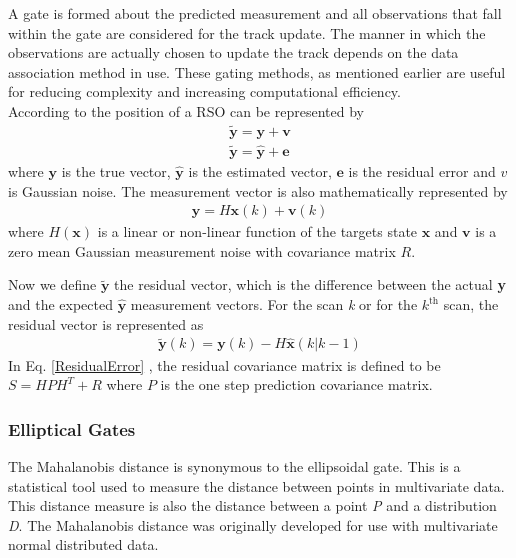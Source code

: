 \documentclass[]{aiaa-tc}%
\begin{document}
A gate is formed about the predicted measurement and all observations that fall within the gate are considered for the track update. The manner in which the observations are actually chosen to update the track depends on the data association method in use. These gating methods, as mentioned earlier are useful for reducing complexity and increasing computational efficiency. \\

According to \cite{crassidis_optimal_2011} the position of a RSO can be represented by
\begin{align*}
\tilde{\textbf{y}} = \textbf{y} + \textbf{v} \\
\tilde{\textbf{y}} = \hat{\textbf{y}} + \textbf{e}
\end{align*}
where $\textbf{y}$ is the true vector, $\hat{\textbf{y}}$ is the estimated vector, $\textbf{e}$ is the residual error and $v$ is Gaussian noise. The measurement vector is also mathematically represented by
\begin{align}
\label{MsmtEqn}
\textbf{y} = H\textbf{x}(k) + \textbf{v}(k)
\end{align}
where $H(\textbf{x})$ is a linear or non-linear function of the targets state $\textbf{x}$ and $\textbf{v}$ is a zero mean Gaussian measurement noise with covariance matrix $R$.

Now we define $\tilde{\textbf{y}}$ the residual vector, which is the difference between the actual \textbf{y} and the expected $\hat{\textbf{y}}$ measurement vectors. For the scan \textit{k} or for the $k^{\text{th}}$ scan, the residual vector is represented as
\begin{align}
\label{ResidualError}
\tilde{\textbf{y}}(k) = \textbf{y}(k) - H\hat{\textbf{x}}(k|k-1) 
\end{align}
In Eq. \eqref{ResidualError} , the residual covariance matrix is defined to be $S = HPH^T + R$ where $P$ is the one step prediction covariance matrix.

\subsubsection{Elliptical Gates}

The Mahalanobis distance is synonymous to the ellipsoidal gate. This is a statistical tool used to measure the distance between points in multivariate data. This distance measure is also the distance between a point \textit{P} and a distribution \textit{D}. The Mahalanobis distance was originally developed for use with multivariate normal distributed data.\\
\end{document}

